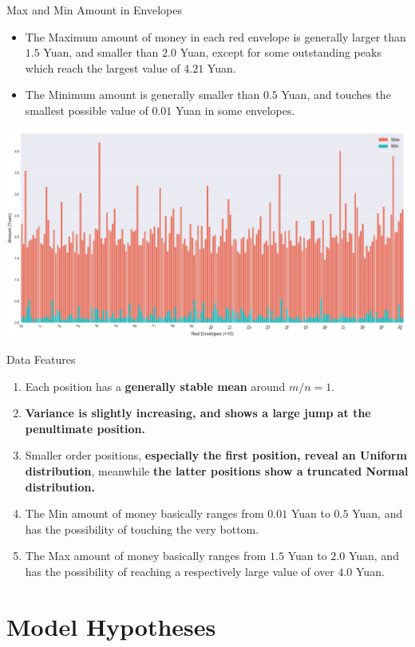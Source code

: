 \documentclass[12pt]{beamer}
\renewcommand{\[}{\begin{equation*} \begin{aligned}} %
\renewcommand{\]}{\end{aligned} \end{equation*}}
\begin{document}
\begin{frame}{Max and Min Amount in Envelopes}
	\begin{itemize}
		\item The Maximum amount of money in each red envelope is generally larger than $1.5$ Yuan, and smaller than $2.0$ Yuan, except for some outstanding peaks which reach the largest value of $4.21$ Yuan.
		\item The Minimum amount is generally smaller than $0.5$ Yuan, and touches the smallest possible value of $0.01$ Yuan in some envelopes.
	\end{itemize}
	\centering
	\includegraphics[scale=0.25]{data3.png}
\end{frame}

\begin{frame}{Data Features}
	\begin{enumerate}
		\item Each position has a \textbf{generally stable mean} around $m/n = 1$.
		\item \textbf{Variance is slightly increasing, and shows a large jump at the penultimate position.}
		\item Smaller order positions, \textbf{especially the first position, reveal an Uniform distribution}, meanwhile \textbf{the latter positions show a truncated Normal distribution.}
		\item The Min amount of money basically ranges from $0.01$ Yuan to $0.5$ Yuan, and has the possibility of touching the very bottom.
		\item The Max amount of money basically ranges from $1.5$ Yuan to $2.0$ Yuan, and has the possibility of reaching a respectively large value of over $4.0$ Yuan.
	\end{enumerate}
\end{frame}

\section{Model Hypotheses}
\end{document}
